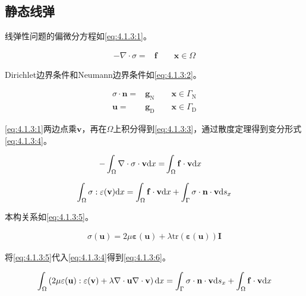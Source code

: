 \subsection{静态线弹}

线弹性问题的偏微分方程如\eqref{eq:4.1.3:1}。

\begin{align}\label{eq:4.1.3:1}
  -\nabla\cdot\sigma=& \mathbf f  \qquad \mathbf x\in\Omega
\end{align}

Dirichlet边界条件和Neumann边界条件如\eqref{eq:4.1.3:2}。

\begin{subequations}\label{eq:4.1.3:2}
  \begin{align}
    \sigma\cdot\mathbf n =& \mathbf g_{\mathrm N} \qquad \mathbf x\in\Gamma_{\mathrm N}\\
    \mathbf u =& \mathbf g_{\mathrm D} \qquad \mathbf x\in\Gamma_{\mathrm D}
  \end{align}
\end{subequations}

\eqref{eq:4.1.3:1}两边点乘$\mathbf v$，再在$\Omega$上积分得到\eqref{eq:4.1.3:3}，通过散度定理得到变分形式\eqref{eq:4.1.3:4}。

\begin{align}\label{eq:4.1.3:3}
  -\int_{\Omega}\nabla\cdot\sigma\cdot\mathbf v\mathrm{d} x =& \int_{\Omega}\mathbf f\cdot\mathbf v\mathrm{d} x
\end{align}
  
\begin{align}\label{eq:4.1.3:4}
   \int_{\Omega}\sigma:\varepsilon(\mathbf v)\mathrm{d} x = \int_{\Omega}\mathbf f\cdot\mathbf v\mathrm{d} x + \int_{\Gamma}\sigma\cdot\mathbf n\cdot\mathbf v\mathrm{d} s_x
\end{align}

本构关系如\eqref{eq:4.1.3:5}。

\begin{align}\label{eq:4.1.3:5}
  \sigma(\mathbf u) = 2\mu\mathbf \varepsilon(\mathbf u) + \lambda\mathrm{tr}(\mathbf\varepsilon(\mathbf u))\mathbf I
\end{align}

将\eqref{eq:4.1.3:5}代入\eqref{eq:4.1.3:4}得到\eqref{eq:4.1.3:6}。  
   
\begin{align}\label{eq:4.1.3:6}
  \int_{\Omega}\left(2\mu\mathbf \varepsilon(\mathbf u) :\mathbf\varepsilon(\mathbf v)+\lambda\nabla\cdot\mathbf u \nabla\cdot\mathbf v\right)\mathrm{d} x =
  \int_{\Gamma}\sigma\cdot\mathbf n\cdot\mathbf v\mathrm{d} s_x + \int_{\Omega}\mathbf f\cdot\mathbf v\mathrm{d} x
\end{align}

